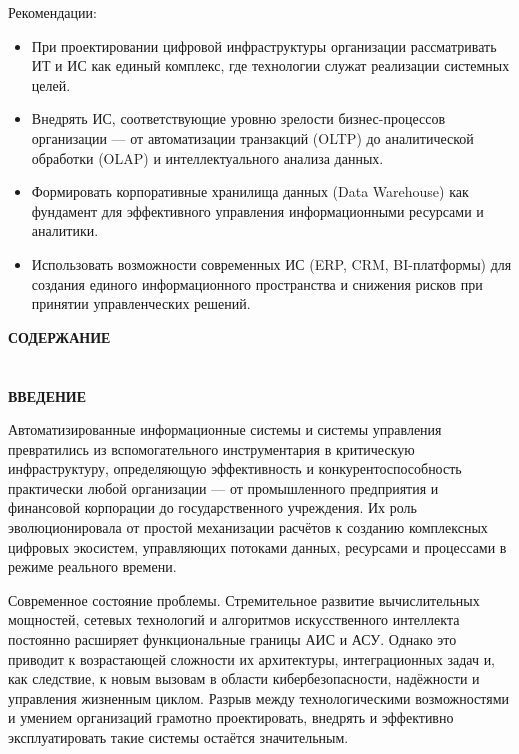\documentclass{SibFU-docs}
\begin{document}
Рекомендации:

\begin{itemize}[label=-]
\item При проектировании цифровой инфраструктуры организации рассматривать ИТ и ИС как единый комплекс, где технологии служат реализации системных целей.
\item Внедрять ИС, соответствующие уровню зрелости бизнес-процессов организации — от автоматизации транзакций (OLTP) до аналитической обработки (OLAP) и интеллектуального анализа данных.
\item Формировать корпоративные хранилища данных (Data Warehouse) как фундамент для эффективного управления информационными ресурсами и аналитики.
\item Использовать возможности современных ИС (ERP, CRM, BI-платформы) для создания единого информационного пространства и снижения рисков при принятии управленческих решений.
\end{itemize}

\newpage

\thispagestyle{empty}
\begin{center}
\bfseries СОДЕРЖАНИЕ
\end{center}
\vspace{-6pt}
\tableofcontents
\clearpage

\section*{}
\vspace*{-2.5em}
\begin{center}\textbf{ВВЕДЕНИЕ}\end{center}
{}

Автоматизированные информационные системы и системы управления превратились из вспомогательного инструментария в критическую инфраструктуру, определяющую эффективность и конкурентоспособность практически любой организации — от промышленного предприятия и финансовой корпорации до государственного учреждения. Их роль эволюционировала от простой механизации расчётов к созданию комплексных цифровых экосистем, управляющих потоками данных, ресурсами и процессами в режиме реального времени.

Современное состояние проблемы. Стремительное развитие вычислительных мощностей, сетевых технологий и алгоритмов искусственного интеллекта постоянно расширяет функциональные границы АИС и АСУ. Однако это приводит к возрастающей сложности их архитектуры, интеграционных задач и, как следствие, к новым вызовам в области кибербезопасности, надёжности и управления жизненным циклом. Разрыв между технологическими возможностями и умением организаций грамотно проектировать, внедрять и эффективно эксплуатировать такие системы остаётся значительным.
\end{document}
